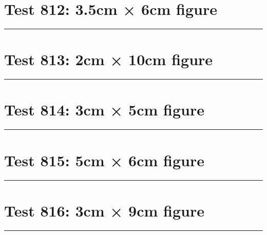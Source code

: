 \documentclass[a4paper,11pt]{article}
\begin{document}
\section*{Test 812: 3.5cm × 6cm figure}
\begin{swarmwrap}%
  \begin{minipage}[t]{3cm}
    \centering
    \rule{\linewidth}{6cm}
  \end{minipage}%
\end{swarmwrap}%
\swarmwrapnext
\lipsum[85]
\lipsum[86]
\lipsum[87]
\lipsum[88]
\lipsum[89]
\section*{Test 813: 2cm × 10cm figure}
\begin{swarmwrap}%
  \begin{minipage}[t]{2cm}
    \centering
    \rule{\linewidth}{10cm}
  \end{minipage}%
\end{swarmwrap}%
\swarmwrapnext
\lipsum[4]
\lipsum[5]
\lipsum[6]
\lipsum[7]
\lipsum[8]
\lipsum[9]
\section*{Test 814: 3cm × 5cm figure}
\begin{swarmwrap}%
  \begin{minipage}[t]{3cm}
    \centering
    \rule{\linewidth}{5cm}
  \end{minipage}%
\end{swarmwrap}%
\swarmwrapnext
\lipsum[146]
\lipsum[147]
\lipsum[148]
\lipsum[149]
\lipsum[150]
\section*{Test 815: 5cm × 6cm figure}
\begin{swarmwrap}%
  \begin{minipage}[t]{5cm}
    \centering
    \rule{\linewidth}{6cm}
  \end{minipage}%
\end{swarmwrap}%
\swarmwrapnext
\lipsum[120]
\lipsum[121]
\lipsum[122]
\lipsum[123]
\section*{Test 816: 3cm × 9cm figure}
\begin{swarmwrap}%
  \begin{minipage}[t]{3cm}
    \centering
    \rule{\linewidth}{9cm}
  \end{minipage}%
\end{swarmwrap}%
\swarmwrapnext
\lipsum[141]
\lipsum[142]
\lipsum[143]
\lipsum[144]
\end{document}
